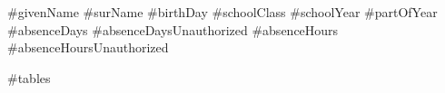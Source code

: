 \documentclass[11pt,a4paper]{article}
\begin{document}
#givenName
#surName
#birthDay
#schoolClass
#schoolYear
#partOfYear
#absenceDays
#absenceDaysUnauthorized
#absenceHours
#absenceHoursUnauthorized

#tables
\end{document}
